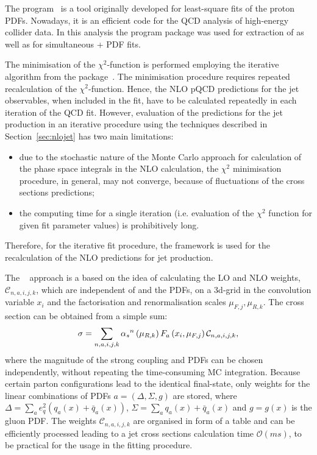 The \herafitter program~\cite{Aaron:2009aa,Aaron:2009kv} is a tool originally developed for least-square fits of the proton PDFs. Nowadays, it is an efficient code for the QCD analysis of high-energy collider data. In this analysis the \herafitter program package was used for extraction of \as as well as for simultaneous \as+ PDF fits.

The minimisation of the $\chi^2$-function is performed employing the iterative \migrad algorithm from the \minuit package~\cite{James:1975dr}. The minimisation procedure requires repeated recalculation of the $\chi^2$-function. Hence, the NLO pQCD predictions for the jet observables, when included in the fit, have to be calculated repeatedly in each iteration of the QCD fit. However, evaluation of the predictions for the jet production in an iterative procedure using the techniques described in Section~\ref{sec:nlojet} has two main limitations: 
\begin{itemize}
 \item due to the stochastic nature of the Monte Carlo approach for calculation of the phase space integrals in the NLO calculation, the $\chi^2$ minimisation procedure, in general, may not converge, because of fluctuations of the cross sections predictions;
 \item the computing time for a single iteration (i.e. evaluation of the $\chi^2$ function for given fit parameter values) is prohibitively long.
\end{itemize}
Therefore, for the iterative fit procedure, the \fastnlo framework is used for the recalculation of the NLO predictions for jet production. 

The \fastnlo~\cite{thesis:wobisch:2001,Kluge:2006,Wobisch:2011,Britzger:2012} approach is a based on the idea of calculating the LO and NLO weights, $\mathcal{C}_{n,a,i,j,k}$, which are independent of \as and the PDFs, on a 3d-grid in the convolution variable $x_i$ and the factorisation and renormalisation scales $\mu_{F,j}, \mu_{R,k}$. The cross section can be obtained from a simple sum:
\begin{equation}
\sigma = \sum_{n,a,i,j,k}{ \mbox{$\alpha_{s}$}^n\left( \mu_{R,k} \right) F_a\left( x_i, \mu_{F,j}\right)\mathcal{C}_{n,a,i,j,k} },
\end{equation}
where the magnitude of the strong coupling and PDFs can be chosen independently, without repeating the time-consuming MC integration. Because certain parton configurations lead to the identical final-state, only weights for the linear combinations of PDFs $a=\left( \Delta, \Sigma, g\right) $ are stored, where $\Delta=\sum_a{e_q^2\left(q_a\left(x\right)+\bar{q}_a\left(x\right)\right)}$, $\Sigma=\sum_a{q_a\left(x\right)+\bar{q}_a\left(x\right)}$ and $g=g\left(x\right)$ is the gluon PDF. The weights $\mathcal{C}_{n,a,i,j,k}$ are organised in form of a table and can be efficiently processed leading to a jet cross sections calculation time $\mathcal{O}\left( ms\right)$, to be practical for the usage in the fitting procedure.

